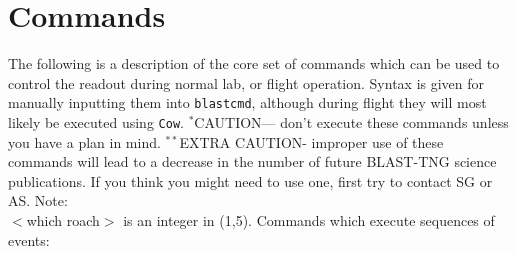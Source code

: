\section{Commands}
The following is a description of the core set of commands which can be used to control the readout during normal lab, or flight operation. Syntax is given for manually inputting them into \texttt{blastcmd}, although during flight they will most likely be executed using \texttt{Cow}.
$^{*}$CAUTION--- don’t execute these commands unless you have a plan in mind.
$^{**}$EXTRA CAUTION- improper use of these commands will lead to a decrease in the number of future BLAST-TNG science publications. If you think you might need to use one, first try to contact SG or AS.
Note:\\
$<$which roach$>$ is an integer in (1,5).
Commands which execute sequences of events:

